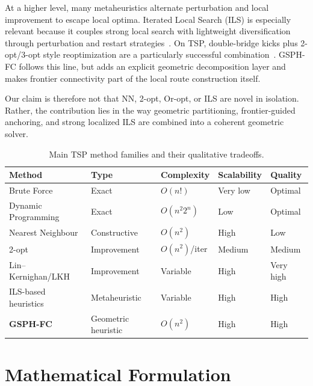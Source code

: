 \documentclass[runningheads]{llncs}
\begin{document}
At a higher level, many metaheuristics alternate perturbation and local
improvement to escape local optima. Iterated Local Search (ILS) is
especially relevant because it couples strong local search with
lightweight diversification through perturbation and restart
strategies~\cite{lourencco2003ils}. On TSP, double-bridge kicks plus
2-opt/3-opt style reoptimization are a particularly successful
combination~\cite{martin1991large}. GSPH-FC follows this line, but adds
an explicit geometric decomposition layer and makes frontier
connectivity part of the local route construction itself.

Our claim is therefore not that NN, 2-opt, Or-opt, or ILS are novel in
isolation. Rather, the contribution lies in the way geometric
partitioning, frontier-guided anchoring, and strong localized ILS are
combined into a coherent geometric solver.

\begin{table}
\caption{Main TSP method families and their qualitative tradeoffs.}
\label{tab:comparison}
\centering\small
\begin{tabular}{@{}lllll@{}}
\toprule
\textbf{Method} & \textbf{Type} & \textbf{Complexity} & \textbf{Scalability} & \textbf{Quality} \\
\midrule
Brute Force         & Exact         & $O(n!)$      & Very low  & Optimal \\
Dynamic Programming & Exact         & $O(n^2 2^n)$ & Low       & Optimal \\
Nearest Neighbour   & Constructive  & $O(n^2)$     & High      & Low \\
2-opt               & Improvement   & $O(n^2)$/iter& Medium    & Medium \\
Lin--Kernighan/LKH  & Improvement   & Variable     & High      & Very high \\
ILS-based heuristics& Metaheuristic & Variable     & High      & High \\
\textbf{GSPH-FC}   & Geometric heuristic & $O(n^2)$ & High & High \\
\bottomrule
\end{tabular}
\end{table}

\section{Mathematical Formulation}
\label{sec:formulation}
\end{document}
